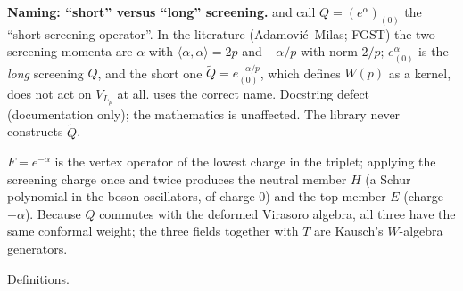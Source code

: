 \begin{warning}
\textbf{Naming: ``short'' versus ``long'' screening.}  and
 call $Q=(e^\alpha)_{(0)}$ the ``short screening operator''. In the
literature (Adamovi\'c--Milas; FGST) the two screening momenta are $\alpha$ with
$\langle\alpha,\alpha\rangle=2p$ and $-\alpha/p$ with norm $2/p$; $e^{\alpha}_{(0)}$ is the \emph{long}
screening $Q$, and the short one $\widetilde Q=e^{-\alpha/p}_{(0)}$, which defines $W(p)$ as a kernel,
does not act on $V_{L_p}$ at all.  uses the correct name. Docstring defect
(documentation only); the mathematics is unaffected. The library never constructs $\widetilde Q$.
\end{warning}
\begin{physics}
$F=e^{-\alpha}$ is the vertex operator of the lowest charge in the triplet; applying the screening
charge once and twice produces the neutral member $H$ (a Schur polynomial in the boson oscillators,
of charge $0$) and the top member $E$ (charge $+\alpha$). Because $Q$ commutes with the deformed
Virasoro algebra, all three have the same conformal weight; the three fields together with $T$ are
Kausch's $W$-algebra generators.
\end{physics}
\begin{status}
Definitions.
\end{status}

